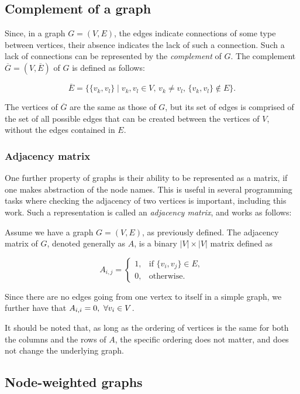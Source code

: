 \documentclass{mimosis}
\begin{document}
\subsection{Complement of a graph}

Since, in a graph \( G = (V, E) \), the edges indicate connections of some type between vertices, their absence indicates the lack of such a connection. 
Such a lack of connections can be represented by the \emph{complement} of \( G \). 
The complement \( \overline{G} = (V, \overline{E}) \) of  \( G \) is defined as follows:

\[
    \overline{E} = \big\{ \{v_k, v_l\} \mid v_k, v_l \in V, \, v_k \neq v_l, \, \{v_k, v_l\} \notin E \big\}.
\]

The vertices of \( \overline{G} \) are the same as those of \( G \), but its set of edges is comprised of the set of all possible edges that can be created between the vertices of \( V \), without the edges contained in \( E \).

\subsubsection{Adjacency matrix} %

One further property of graphs is their ability to be represented as a matrix, if one makes abstraction of the node names. 
This is useful in several programming tasks where checking the adjacency of two vertices is important, including this work. 
Such a representation is called an \emph{adjacency matrix}, and works as follows:

Assume we have a graph \( G = (V, E) \), as previously defined. 
The adjacency matrix of \( G \), denoted generally as \( A \), is a binary \( |V| \times |V| \) matrix defined as

\[
A_{i,j} =
\begin{cases}
1, & \text{if } \{v_i, v_j\} \in E, \\
0, & \text{otherwise}.
\end{cases}
\]

Since there are no edges going from one vertex to itself in a simple graph, we further have that \( A_{i,i} = 0, ~\forall \space v_i \in V \).

It should be noted that, as long as the ordering of vertices is the same for both the columns and the rows of \( A \), the specific ordering does not matter, and does not change the underlying graph.

\subsection{Node-weighted graphs}
\end{document}
